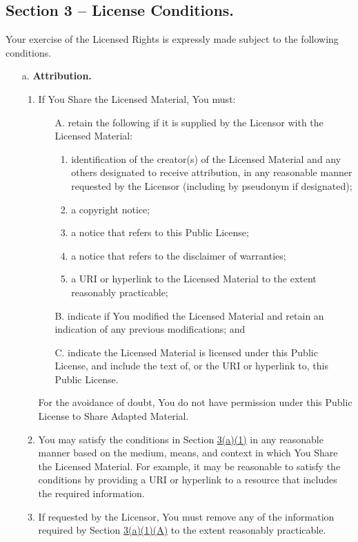 \subsection*{Section 3 – License Conditions.}
Your exercise of the Licensed Rights is expressly made subject to the following conditions.
\begin{itemize}
\item[a.] \textbf{Attribution.}
	\begin{enumerate}
	\item If You Share the Licensed Material, You must:
		\begin{enumerate}
		\item[A.] retain the following if it is supplied by the Licensor with the Licensed Material:
			\begin{enumerate}
			\item identification of the creator(s) of the Licensed Material and any others designated to receive attribution, in any reasonable manner requested by the Licensor (including by pseudonym if designated);
			\item a copyright notice;
			\item a notice that refers to this Public License;
			\item a notice that refers to the disclaimer of warranties;
			\item a URI or hyperlink to the Licensed Material to the extent reasonably practicable;
			\end{enumerate}
		\item[B.] indicate if You modified the Licensed Material and retain an indication of any previous modifications; and
		\item[C.] indicate the Licensed Material is licensed under this Public License, and include the text of, or the URI or hyperlink to, this Public License.
		\end{enumerate}
For the avoidance of doubt, You do not have permission under this Public License to Share Adapted Material.
\item You may satisfy the conditions in Section \href{https://creativecommons.org/licenses/by-nc-nd/4.0/legalcode#s3a1A}{3(a)(1)} in any reasonable manner based on the medium, means, and context in which You Share the Licensed Material. For example, it may be reasonable to satisfy the conditions by providing a URI or hyperlink to a resource that includes the required information.
\item If requested by the Licensor, You must remove any of the information required by Section \href{https://creativecommons.org/licenses/by-nc-nd/4.0/legalcode#s3a1A}{3(a)(1)(A)} to the extent reasonably practicable.
	\end{enumerate}
\end{itemize}

